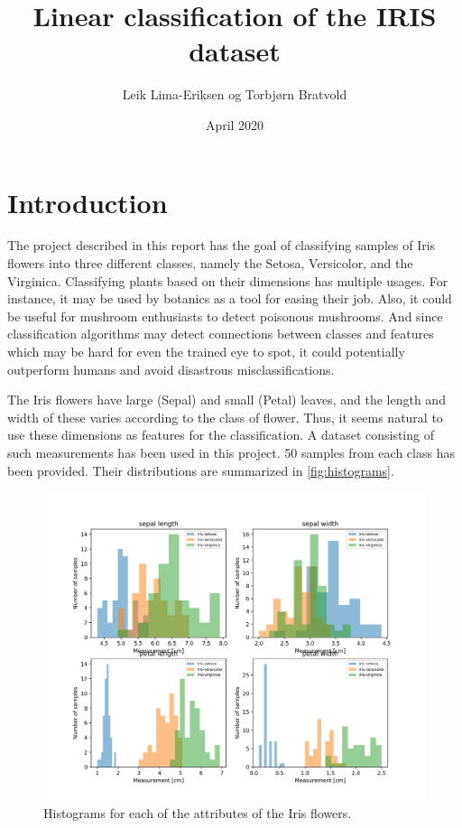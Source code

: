 \documentclass{article}
\begin{document}
\title{Linear classification of the IRIS dataset}
\author{Leik Lima-Eriksen og Torbjørn Bratvold}
\date{April 2020}

\maketitle

\section{Introduction}
The project described in this report has the goal of classifying samples of Iris flowers into
three different classes, namely the Setosa, Versicolor, and the Virginica. Classifying plants
based on their dimensions has multiple usages. For instance, it may be used by botanics as a tool
for easing their job. Also, it could be useful for mushroom enthusiasts to detect poisonous
mushrooms. And since classification algorithms may detect connections between classes and features
which may be hard for even the trained eye to spot, it could potentially outperform humans and
avoid disastrous misclassifications.

The Iris flowers have large (Sepal) and small (Petal) leaves, and the length and width of these
varies according to the class of flower. Thus, it seems natural to use these dimensions as features
for the classification. A dataset consisting of such measurements has been used in this project. 50
samples from each class has been provided. Their distributions are summarized in \autoref{fig:histograms}.

\begin{figure}
    \centering
    \includegraphics[width=\textwidth]{../images/iris_histograms.png}
    \caption{Histograms for each of the attributes of the Iris flowers.}
    \label{fig:histograms}
\end{figure}
\end{document}
